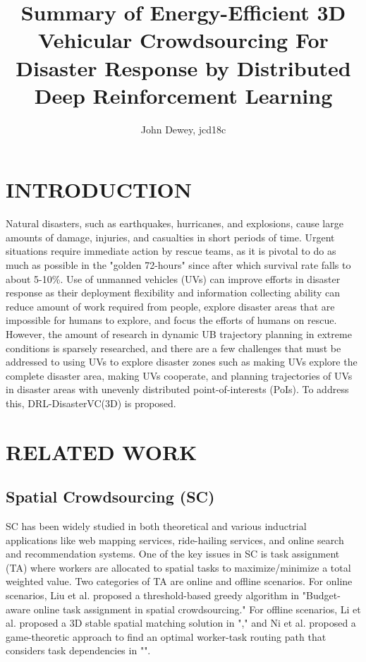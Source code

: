 \documentclass[sigconf, natbib=false]{acmart}
\begin{document}
   \title{Summary of Energy-Efficient 3D Vehicular Crowdsourcing For Disaster Response by Distributed Deep Reinforcement Learning}
   \author{John Dewey, jcd18c}
   \maketitle

   \section{INTRODUCTION}
   Natural disasters, such as earthquakes, hurricanes, and explosions, cause large amounts of damage, injuries, and casualties in short periods of time. Urgent situations require immediate action by rescue teams, as it is pivotal to do as much as possible in the "golden 72-hours" since after which survival rate falls to about 5-10\%. Use of unmanned vehicles (UVs) can improve efforts in disaster response as their deployment flexibility and information collecting ability can reduce amount of work required from people, explore disaster areas that are impossible for humans to explore, and focus the efforts of humans on rescue. However, the amount of research in dynamic UB trajectory planning in extreme conditions is sparsely researched, and there are a few challenges that must be addressed to using UVs to explore disaster zones such as making UVs explore the complete disaster area, making UVs cooperate, and planning trajectories of UVs in disaster areas with unevenly distributed point-of-interests (PoIs). To address this, DRL-DisasterVC(3D) is proposed.

   \section{RELATED WORK}
   \subsection{Spatial Crowdsourcing (SC)}
   SC has been widely studied in both theoretical and various inductrial applications like web mapping services, ride-hailing services, and online search and recommendation systems. One of the key issues in SC is task assignment (TA) where workers are allocated to spatial tasks to maximize/minimize a total weighted value. Two categories of TA are online and offline scenarios. For online scenarios, Liu et al. proposed a threshold-based greedy algorithm in "Budget-aware online task assignment in spatial crowdsourcing." For offline scenarios, Li et al. proposed a 3D stable spatial matching solution in "," and Ni et al. proposed a game-theoretic approach to find an optimal worker-task routing path that considers task dependencies in "".
\end{document}
